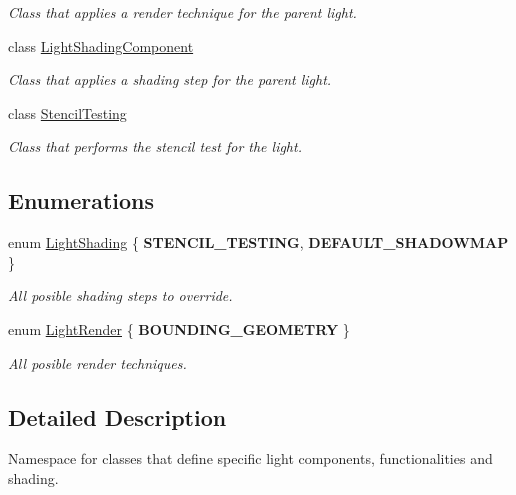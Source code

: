 \begin{DoxyCompactItemize}
\begin{DoxyCompactList}\small\item\em Class that applies a render technique for the parent light. \end{DoxyCompactList}\item 
class \mbox{\hyperlink{class_geometry_engine_1_1_light_utils_1_1_light_shading_component}{Light\+Shading\+Component}}
\begin{DoxyCompactList}\small\item\em Class that applies a shading step for the parent light. \end{DoxyCompactList}\item 
class \mbox{\hyperlink{class_geometry_engine_1_1_light_utils_1_1_stencil_testing}{Stencil\+Testing}}
\begin{DoxyCompactList}\small\item\em Class that performs the stencil test for the light. \end{DoxyCompactList}\end{DoxyCompactItemize}
\subsection*{Enumerations}
\begin{DoxyCompactItemize}
\item 
\mbox{\label{namespace_geometry_engine_1_1_light_utils_a16eb370137c2fd151e6f8e1d07cd23e0}} 
enum \mbox{\hyperlink{namespace_geometry_engine_1_1_light_utils_a16eb370137c2fd151e6f8e1d07cd23e0}{Light\+Shading}} \{ {\bfseries S\+T\+E\+N\+C\+I\+L\+\_\+\+T\+E\+S\+T\+I\+NG}, 
{\bfseries D\+E\+F\+A\+U\+L\+T\+\_\+\+S\+H\+A\+D\+O\+W\+M\+AP}
 \}
\begin{DoxyCompactList}\small\item\em All posible shading steps to override. \end{DoxyCompactList}\item 
\mbox{\label{namespace_geometry_engine_1_1_light_utils_ac3078de660742daceaa06bd9bc61d24a}} 
enum \mbox{\hyperlink{namespace_geometry_engine_1_1_light_utils_ac3078de660742daceaa06bd9bc61d24a}{Light\+Render}} \{ {\bfseries B\+O\+U\+N\+D\+I\+N\+G\+\_\+\+G\+E\+O\+M\+E\+T\+RY}
 \}
\begin{DoxyCompactList}\small\item\em All posible render techniques. \end{DoxyCompactList}\end{DoxyCompactItemize}


\subsection{Detailed Description}
Namespace for classes that define specific light components, functionalities and shading. 